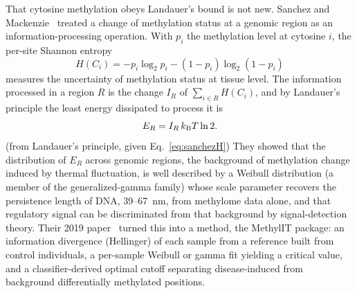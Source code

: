 That cytosine methylation obeys Landauer's bound is not new. Sanchez and Mackenzie~\cite{Sanchez2016} treated a change of methylation
status at a genomic region as an information-processing operation. With $p_i$ the methylation level at cytosine $i$, the per-site Shannon
entropy
\begin{equation}
  H(C_i)=-p_i\log_2p_i-(1-p_i)\log_2(1-p_i)
  \label{eq:sanchezH}
\end{equation}
measures the uncertainty of methylation status at tissue level. The information processed in a region $R$ is the change $I_R$ of
$\sum_{i\in R}H(C_i)$, and by Landauer's principle the least energy dissipated to process it is
\begin{equation}
  E_R=I_R\,k_{\mathrm B} T\ln2 .
  \label{eq:sanchezER}
\end{equation}
\derived{} (from Landauer's principle, given Eq.~\eqref{eq:sanchezH}) They showed that the distribution of $E_R$ across genomic regions, the
background of methylation change induced by thermal fluctuation, is well described by a Weibull distribution (a member of the
generalized-gamma family) whose scale parameter recovers the persistence length of DNA, 39--67~nm, from methylome data alone, and that
regulatory signal can be discriminated from that background by signal-detection theory. \observed{} Their 2019 paper~\cite{Sanchez2019}
turned this into a method, the MethylIT package: an information divergence (Hellinger) of each sample from a reference built from control
individuals, a per-sample Weibull or gamma fit yielding a critical value, and a classifier-derived optimal cutoff separating disease-induced
from background differentially methylated positions. \observed

